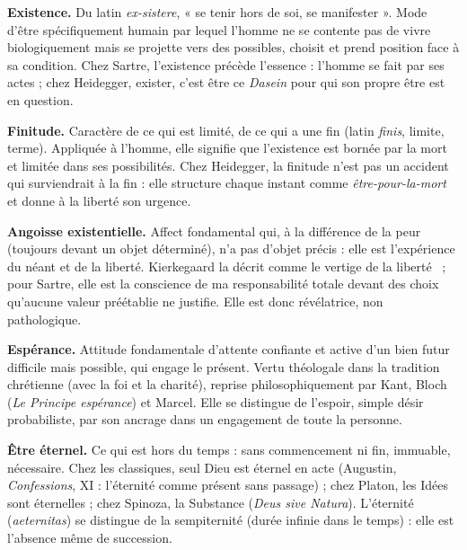 \documentclass[11pt]{article}
\begin{document}
\begin{corrige}
\textbf{Existence.} Du latin \emph{ex-sistere}, « se tenir hors de soi, se manifester ». Mode d'être spécifiquement humain par lequel l'homme ne se contente pas de vivre biologiquement mais se projette vers des possibles, choisit et prend position face à sa condition. Chez Sartre, l'existence précède l'essence : l'homme se fait par ses actes ; chez Heidegger, exister, c'est être ce \emph{Dasein} pour qui son propre être est en question.

\textbf{Finitude.} Caractère de ce qui est limité, de ce qui a une fin (latin \emph{finis}, limite, terme). Appliquée à l'homme, elle signifie que l'existence est bornée par la mort et limitée dans ses possibilités. Chez Heidegger, la finitude n'est pas un accident qui surviendrait à la fin : elle structure chaque instant comme \emph{être-pour-la-mort} et donne à la liberté son urgence.

\textbf{Angoisse existentielle.} Affect fondamental qui, à la différence de la peur (toujours devant un objet déterminé), n'a pas d'objet précis : elle est l'expérience du néant et de la liberté. Kierkegaard la décrit comme le \guillemotleft vertige de la liberté \guillemotright\ ; pour Sartre, elle est la conscience de ma responsabilité totale devant des choix qu'aucune valeur préétablie ne justifie. Elle est donc révélatrice, non pathologique.

\textbf{Espérance.} Attitude fondamentale d'attente confiante et active d'un bien futur difficile mais possible, qui engage le présent. Vertu théologale dans la tradition chrétienne (avec la foi et la charité), reprise philosophiquement par Kant, Bloch (\emph{Le Principe espérance}) et Marcel. Elle se distingue de l'espoir, simple désir probabiliste, par son ancrage dans un engagement de toute la personne.

\textbf{Être éternel.} Ce qui est hors du temps : sans commencement ni fin, immuable, nécessaire. Chez les classiques, seul Dieu est éternel en acte (Augustin, \emph{Confessions}, XI : l'éternité comme présent sans passage) ; chez Platon, les Idées sont éternelles ; chez Spinoza, la Substance (\emph{Deus sive Natura}). L'éternité (\emph{aeternitas}) se distingue de la sempiternité (durée infinie dans le temps) : elle est l'absence même de succession.
\end{corrige}
\end{document}
